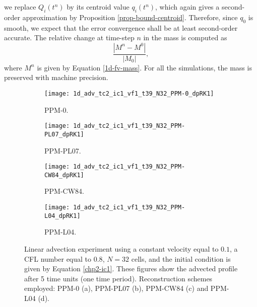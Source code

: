 we replace $Q_{i}(t^n)$ by its centroid value $q_{i}(t^n)$, which again gives
a second-order approximation by Proposition \ref{prop-bound-centroid}.
Therefore, since $q_0$ is smooth, we expect that the error convergence shall be at least second-order accurate. The relative change at time-step $n$ in the mass is computed as 
\begin{equation*}
	\frac{|M^n-M^0|}{|M_0|},
\end{equation*}
where $M^n$ is given by Equation \eqref{1d-fv-mass}. For all the simulations, the
mass is preserved with machine precision. 
\newpage
\begin{figure}[!htb]
  \centering
  \begin{subfigure}{0.45\textwidth}
    \centering
			\texttt{[image: 1d\_adv\_tc2\_ic1\_vf1\_t39\_N32\_PPM-0\_dpRK1]}
			\caption{PPM-0.\label{chp2-sec-exp-adv1-a}}
  \end{subfigure}
  \begin{subfigure}{0.45\textwidth}
    \centering
			\texttt{[image: 1d\_adv\_tc2\_ic1\_vf1\_t39\_N32\_PPM-PL07\_dpRK1]}
			\caption{PPM-PL07.\label{chp2-sec-exp-adv1-b}}
  \end{subfigure}

  \begin{subfigure}{0.45\textwidth}
    \centering
		\texttt{[image: 1d\_adv\_tc2\_ic1\_vf1\_t39\_N32\_PPM-CW84\_dpRK1]}
    \caption{PPM-CW84.\label{chp2-sec-exp-adv1-c}}
  \end{subfigure}
  \begin{subfigure}{0.45\textwidth}
    \centering
			\texttt{[image: 1d\_adv\_tc2\_ic1\_vf1\_t39\_N32\_PPM-L04\_dpRK1]}
      \caption{PPM-L04.\label{chp2-sec-exp-adv1-d}}
  \end{subfigure} 
	\caption{Linear advection experiment using a constant velocity equal to $0.1$,
  a CFL number equal to $0.8$, $N=32$ cells, and the initial condition is given by Equation \eqref{chp2-ic1}.
	These figures show the advected profile after 5 time units (one time period).
	Reconstruction schemes employed: PPM-0 (a), PPM-PL07 (b), PPM-CW84
	(c) and PPM-L04 (d). \label{chp2-sec-exp-adv1}}
\end{figure}

